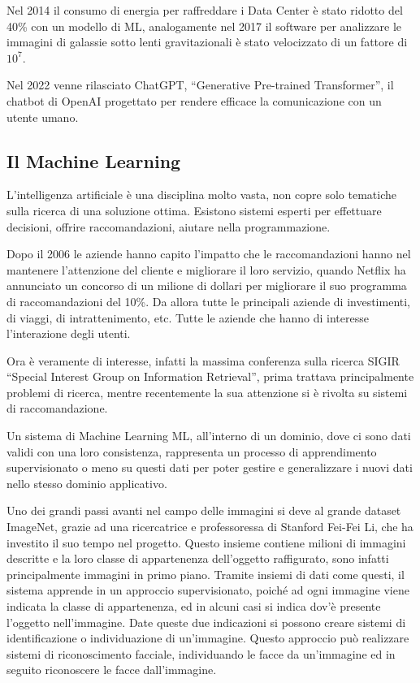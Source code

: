 \documentclass{article}
\numberwithin{equation}{subsection}
\begin{document}
Nel 2014 il consumo di energia per raffreddare i Data Center è stato ridotto del 40\% con un modello 
di ML, analogamente nel 2017 il software per analizzare le immagini di galassie sotto lenti 
gravitazionali è stato velocizzato di un fattore di $10^7$.  

Nel 2022 venne rilasciato ChatGPT, ``Generative Pre-trained Transformer'', il chatbot di OpenAI 
progettato per rendere efficace la comunicazione con un utente umano. 

\subsection{Il Machine Learning}

L'intelligenza artificiale è una disciplina molto vasta, non copre solo tematiche sulla ricerca di una 
soluzione ottima. Esistono sistemi esperti per effettuare decisioni, offrire raccomandazioni, aiutare nella 
programmazione. 

Dopo il 2006 le aziende hanno capito l'impatto che le raccomandazioni hanno nel mantenere l'attenzione del 
cliente e migliorare il loro servizio, quando Netflix ha annunciato un concorso di un milione di dollari 
per migliorare il suo programma di raccomandazioni del 10\%. Da allora tutte le principali aziende di 
investimenti, di viaggi, di intrattenimento, etc. Tutte le aziende che hanno di interesse l'interazione 
degli utenti. 

Ora è veramente di interesse, infatti la massima conferenza sulla ricerca SIGIR
``Special Interest Group on Information Retrieval'', prima trattava principalmente problemi di ricerca, 
mentre recentemente la sua attenzione si è rivolta su sistemi di raccomandazione. 

Un sistema di Machine Learning ML, all'interno di un dominio, dove ci sono dati validi con una loro 
consistenza, rappresenta un processo di apprendimento supervisionato o meno su questi dati per 
poter gestire e generalizzare i nuovi dati nello stesso dominio applicativo. 

Uno dei grandi passi avanti nel campo delle immagini si deve al grande dataset ImageNet, grazie ad una 
ricercatrice e professoressa di Stanford Fei-Fei Li, che ha investito il suo tempo nel progetto. Questo insieme contiene 
milioni di immagini descritte e la loro classe di appartenenza dell'oggetto raffigurato, sono infatti 
principalmente immagini in primo piano. Tramite insiemi di dati come questi, il sistema apprende in un 
approccio supervisionato, poiché ad ogni immagine viene indicata la classe di appartenenza, ed in alcuni casi 
si indica dov'è presente l'oggetto nell'immagine. Date queste due indicazioni si possono creare sistemi di 
identificazione o individuazione di un'immagine. 
Questo approccio può realizzare sistemi di riconoscimento facciale, individuando le facce da un'immagine ed in 
seguito riconoscere le facce dall'immagine. 
\end{document}
